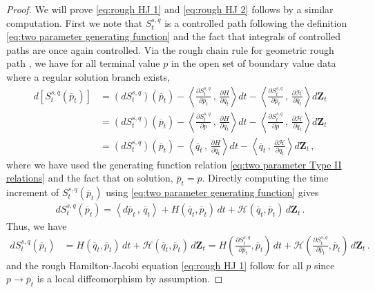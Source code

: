 \documentclass[11pt, oneside]{article}
\numberwithin{equation}{section}
\theoremstyle{definition}
\newcommand{\ob}[1]{\overline{#1}}
\newcommand{\mc}[1]{\mathcal{#1}}
\newcommand{\mcal}[1]{\mc{#1}}
\newcommand{\scp}[2]{{\left\langle {#1}\, , \, {#2}\right\rangle}}
\def\p{{\partial}}
\def\p{\partial}
\begin{document}
\begin{proof}
We will prove \eqref{eq:rough HJ 1} and \eqref{eq:rough HJ 2} follows by a similar computation. First we note that $S^{s,q}_t$ is a controlled path following the definition \eqref{eq:two parameter generating function} and the fact that integrals of controlled paths are once again controlled.
Via the rough chain rule for geometric rough path \cite[Thm. 3.3]{CHLN2022}, we have for all terminal value $p$ in the open set of boundary value data where a regular solution branch exists,
\begin{align*}
    d \left[S^{s,q}_t(\ob{p}_t)\right] &= \left(d S^{s,q}_t\right)(\ob{p}_t)- \scp{\frac{\p S^{s,q}_t}{\p \ob{p}_t}}{\frac{\p H}{\p \ob{q}_t}}dt - \scp{\frac{\p S^{s,q}_t}{\p \ob{p}_t}}{\frac{\p \mcal{H}}{\p \ob{q}_t}}d\mathbf{Z}_t \\
    & = \left(d S^{s,q}_t\right)(\ob{p}_t)- \scp{\frac{\p S^{s,q}_t}{\p p}}{\frac{\p H}{\p \ob{q}_t}}dt - \scp{\frac{\p S^{s,q}_t}{\p p}}{\frac{\p \mcal{H}}{\p \ob{q}_t}}d\mathbf{Z}_t \\
    &= \left(d S^{s,q}_t\right)(\ob{p}_t)- \scp{\ob{q}_t}{\frac{\p H}{\p \ob{q}_t}}dt - \scp{\ob{q}_t}{\frac{\p \mcal{H}}{\p \ob{q}_t}}d\mathbf{Z}_t\,,
\end{align*}
where we have used the generating function relation \eqref{eq:two parameter Type II relations} and the fact that on solution, $\ob{p}_t = p$. Directly computing the time increment of $S^{s,q}_t(\ob{p}_t)$ using \eqref{eq:two parameter generating function} gives
\begin{align*}
    d S^{s,q}_t(\ob{p}_t) = \scp{d \ob{p}_t}{\ob{q}_t} + H(\ob{q}_t, \ob{p}_t)\,dt + \mcal{H}(\ob{q}_t, \ob{p}_t)\,d\mathbf{Z}_t\,.
\end{align*}
Thus, we have 
\begin{align*}
    d S^{s,q}_t(\ob{p}_t) & = H(\ob{q}_t, \ob{p}_t)\,dt + \mcal{H}(\ob{q}_t, \ob{p}_t)\,d\mathbf{Z}_t =  H\left(\frac{\p S^{s,q}_t}{\p \ob{p}_t}, \ob{p}_t\right)\,dt + \mcal{H}\left(\frac{\p S^{s,q}_t}{\p \ob{p}_t}, \ob{p}_t\right)\,d\mathbf{Z}_t\,.
\end{align*}
and the rough Hamilton-Jacobi equation \eqref{eq:rough HJ 1} follow for all $p$ since $p \rightarrow \ob{p}_t$ is a local diffeomorphism by assumption. 


\end{proof}
\end{document}
